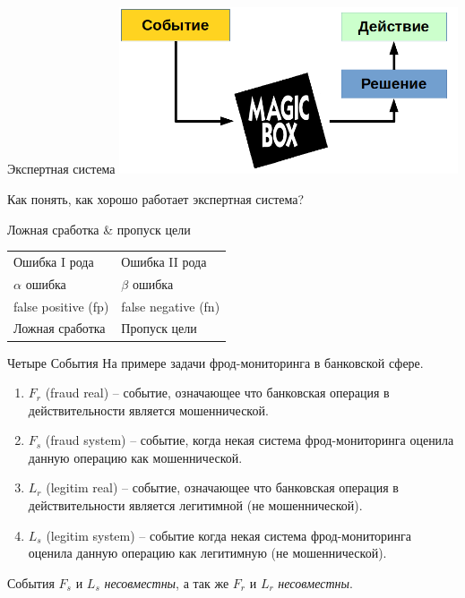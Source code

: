 \documentclass{beamer}
\newcommand{\term}{\textit}
\begin{document}
   \begin{frame}{Экспертная система}
       \includegraphics[width=10cm]{../pic/expert_system_1.png}
       
       Как понять, как хорошо работает экспертная система?
   \end{frame}
  
  \begin{frame}{Ложная сработка \& пропуск цели} 
  \centering
  \LARGE
  \begin{tabular}{l|l}
  	Ошибка I рода & Ошибка II рода \\
  	$\alpha$ ошибка & $\beta$ ошибка \\
  	false positive (fp) & false negative (fn) \\ 
  	Ложная сработка  & Пропуск цели \\
  \end{tabular}
  \end{frame}

  \begin{frame}{Четыре События}
  \small На примере задачи фрод-мониторинга в банковской сфере.
  \begin{enumerate}
  	\item $F_r$ (fraud real) -- событие, означающее что банковская операция в действительности является мошеннической. 
  	\item $F_s$ (fraud system) -- событие, когда некая система фрод-мониторинга оценила данную операцию как мошеннической.
  	\item $L_r$ (legitim real) -- событие, означающее что банковская операция в действительности является легитимной (не мошеннической).
  	\item $L_s$ (legitim system) -- событие когда некая система фрод-мониторинга оценила данную операцию как легитимную (не мошеннической).
  \end{enumerate}
  События $F_s$ и $L_s$ \term{несовместны}, 
  а так же $F_r$ и $L_r$ \term{несовместны}.
  \end{frame}
\end{document}
